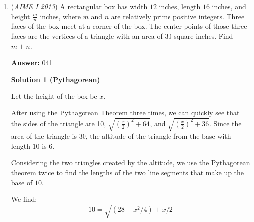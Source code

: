 \begin{enumerate}
 
Case 2: All math books are in the box of capacity 4

 There are 9 books left, and the 3 boxes have 3, 1, and 5 spaces. The number of ways is $\frac{9!}{3!5!}=504$.

 
Case 3: All math books are in the box of capacity 5

 There are 9 books left, and the 3 boxes have 3, 4, and 2 spaces. The number of ways is $\frac{9!}{3!4!2!}=1260$.

 
Adding all these cases and dividing by the total number of ways yields $\frac{126+504+1260}{27720}=\frac{1890}{27720}=\frac{3}{44} \implies m+n=\boxed{47}$.

 


 If ur too lazy to read the above words, try the solution below!

 



\textbf{Solution 6 (No Words)}


 \[\dfrac{\frac{9!}{(3-3)!4!5!} + \frac{9!}{3!(4-3)!5!} + \frac{9!}{3!4!(5-3)!}}{\frac{12!}{3!4!5!}} = \dfrac{3}{44}\implies\boxed{47}.\]



	\item (\textit{AIME I 2013}) A rectangular box has width $12$ inches, length $16$ inches, and height $\frac{m}{n}$ inches, where $m$ and $n$ are relatively prime positive integers. Three faces of the box meet at a corner of the box. The center points of those three faces are the vertices of a triangle with an area of $30$ square inches. Find $m+n$.


 



 
 \textbf{Answer: }041



\textbf{Solution 1 (Pythagorean)}

Let the height of the box be $x$.

 After using the Pythagorean Theorem three times, we can quickly see that the sides of the triangle are 10, $\sqrt{\left(\frac{x}{2}\right)^2 + 64}$, and $\sqrt{\left(\frac{x}{2}\right)^2 + 36}$. Since the area of the triangle is $30$, the altitude of the triangle from the base with length $10$ is $6$.

 Considering the two triangles created by the altitude, we use the Pythagorean theorem twice to find the lengths of the two line segments that make up the base of $10$.

 We find:
 \[10 = \sqrt{\left(28+x^2/4\right)}+x/2\]


\end{enumerate}
